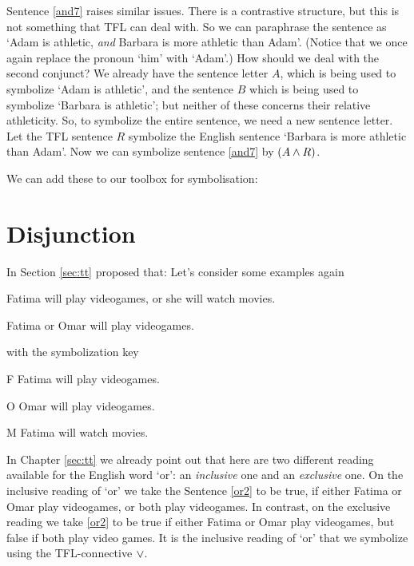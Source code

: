 Sentence \ref{and7} raises similar issues. There is a contrastive structure, but this is not something that TFL can deal with. So we can paraphrase the sentence as `Adam is athletic, \emph{and} Barbara is more athletic than Adam'. (Notice that we once again replace the pronoun `him' with `Adam'.) How should we deal with the second conjunct? We already have the sentence letter $A$, which is being used to symbolize `Adam is athletic', and the sentence $B$ which is being used to symbolize `Barbara is athletic'; but neither of these concerns their relative athleticity. So, to symbolize the entire sentence, we need a new sentence letter. Let the TFL sentence $R$ symbolize the English sentence `Barbara is more athletic than Adam'. Now we can symbolize sentence \ref{and7} by $(A \mathbin{\wedge} R)$.

We can add these to our toolbox for symbolisation:

\section{Disjunction}
In Section \ref{sec:tt} proposed that:
Let's consider some examples again
\begin{earg}
		\item[\ex{or1}] Fatima will play videogames, or she will watch movies.
		\item[\ex{or2}] Fatima or Omar will play videogames.
	\end{earg}
with the symbolization key
\begin{ekey}
		\item[F] Fatima will play videogames.
		\item[O] Omar will play videogames.
		\item[M] Fatima will watch movies.
	\end{ekey}

In Chapter \ref{sec:tt} we already point out that here are two different reading available for the English word `or': an \emph{inclusive} one and an \emph{exclusive} one. On the inclusive reading of `or' we take the Sentence \ref{or2} to be true, if either Fatima or Omar play videogames, or both play videogames. In contrast, on the exclusive reading we take \ref{or2} to be true if either Fatima or Omar play videogames, but false if both play video games. It is the inclusive reading of `or' that we symbolize using the TFL-connective $\vee$.


